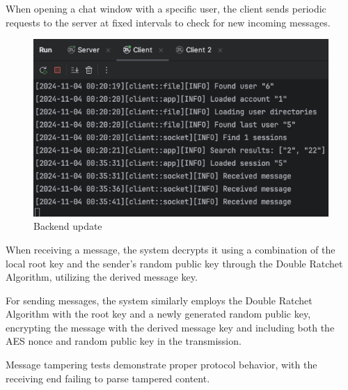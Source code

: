 \documentclass[9pt,a4paper,twoside]{rho-class/rho}
\begin{document}
When opening a chat window with a specific user, the client sends periodic requests to the server at fixed intervals to check for new incoming messages.
\begin{figure}[H]
    \centering
    \includegraphics[width=1\linewidth]{figures/Screenshot 2024-11-04 at 00.35.45.png}
    \caption{Backend update}
    \label{fig:enter-label}
\end{figure}

When receiving a message, the system decrypts it using a combination of the local root key and the sender's random public key through the Double Ratchet Algorithm, utilizing the derived message key. 



For sending messages, the system similarly employs the Double Ratchet Algorithm with the root key and a newly generated random public key, encrypting the message with the derived message key and including both the AES nonce and random public key in the transmission.




Message tampering tests demonstrate proper protocol behavior, with the receiving end failing to parse tampered content. 
\end{document}
